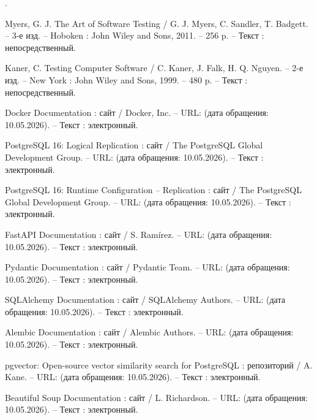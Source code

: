 \begin{list}{.}
\item Myers, G. J. The Art of Software Testing / G. J. Myers, C. Sandler, T. Badgett. – 3-е изд. – Hoboken : John Wiley and Sons, 2011. – 256 p. – Текст : непосредственный.

\item Kaner, C. Testing Computer Software / C. Kaner, J. Falk, H. Q. Nguyen. – 2-е изд. – New York : John Wiley and Sons, 1999. – 480 p. – Текст : непосредственный.

\item Docker Documentation : сайт / Docker, Inc. – URL:  (дата обращения: 10.05.2026). – Текст : электронный.

\item PostgreSQL 16: Logical Replication : сайт / The PostgreSQL Global Development Group. – URL:  (дата обращения: 10.05.2026). – Текст : электронный.

\item PostgreSQL 16: Runtime Configuration – Replication : сайт / The PostgreSQL Global Development Group. – URL:  (дата обращения: 10.05.2026). – Текст : электронный.

\item FastAPI Documentation : сайт / S. Ramírez. – URL:  (дата обращения: 10.05.2026). – Текст : электронный.

\item Pydantic Documentation : сайт / Pydantic Team. – URL:  (дата обращения: 10.05.2026). – Текст : электронный.

\item SQLAlchemy Documentation : сайт / SQLAlchemy Authors. – URL:  (дата обращения: 10.05.2026). – Текст : электронный.

\item Alembic Documentation : сайт / Alembic Authors. – URL:  (дата обращения: 10.05.2026). – Текст : электронный.

\item pgvector: Open-source vector similarity search for PostgreSQL : репозиторий / A. Kane. – URL:  (дата обращения: 10.05.2026). – Текст : электронный.

\item Beautiful Soup Documentation : сайт / L. Richardson. – URL:  (дата обращения: 10.05.2026). – Текст : электронный.


\end{list}
